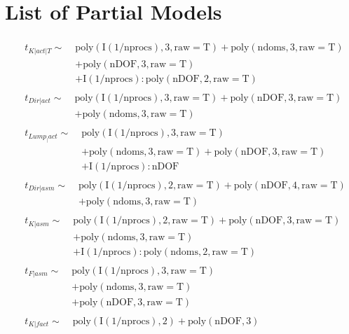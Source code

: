 \section{List of Partial Models}
\label{sec:partialModels}

\begin{align}
&\begin{aligned}
t_{K|act|T} \sim\; &\mathrm{poly(I(1/nprocs), 3, raw=T) + poly(ndoms, 3, raw=T)}\\
&+ \mathrm{poly(nDOF, 3, raw=T)}\\
&+ \mathrm{I(1/nprocs):poly(nDOF, 2, raw=T)}
\end{aligned}\\[10pt]
&\begin{aligned}
t_{Dir|act} \sim\; &\mathrm{poly(I(1/nprocs), 3, raw=T) + poly(nDOF, 3, raw=T)}\\
&+ \mathrm{poly(ndoms, 3, raw=T)}
\end{aligned}\\[10pt]
&\begin{aligned}
t_{Lump_|act} \sim\; &\mathrm{poly(I(1/nprocs), 3, raw=T)}\\
&+ \mathrm{poly(ndoms, 3, raw=T) + poly(nDOF, 3, raw=T)}\\
&+ \mathrm{I(1/nprocs):nDOF}
\end{aligned}\\[10pt]
&\begin{aligned}
t_{Dir|asm} \sim\; &\mathrm{poly(I(1/nprocs), 2, raw=T) + poly(nDOF, 4, raw=T)}\\
&+ \mathrm{poly(ndoms, 3, raw=T)}
\end{aligned}\\[10pt]
&\begin{aligned}
t_{K|asm} \sim\; &\mathrm{poly(I(1/nprocs), 2 ,raw=T) + poly(nDOF, 3, raw=T)}\\
&+ \mathrm{poly(ndoms, 3, raw=T)}\\
&+ \mathrm{I(1/nprocs):poly(ndoms, 2, raw=T)}
\end{aligned}\\[10pt]
&\begin{aligned}
t_{F|asm}  \sim\; &\mathrm{poly(I(1/nprocs), 3, raw=T)}\\
&+ \mathrm{poly(ndoms, 3, raw=T)}\\
&+ \mathrm{poly(nDOF, 3, raw=T)}
\end{aligned}\\[10pt]
&\begin{aligned}
t_{K|fact} \sim\; &\mathrm{poly(I(1/nprocs), 2) + poly(nDOF, 3)}\\

\end{aligned}
\end{align}
